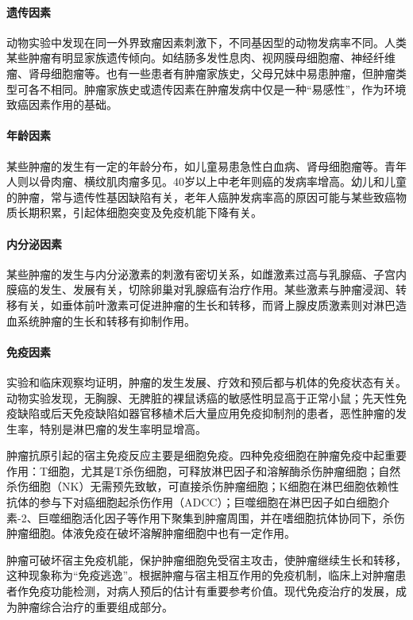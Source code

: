 \paragraph{遗传因素}
动物实验中发现在同一外界致瘤因素刺激下，不同基因型的动物发病率不同。人类某些肿瘤有明显家族遗传倾向。如结肠多发性息肉、视网膜母细胞瘤、神经纤维瘤、肾母细胞瘤等。也有一些患者有肿瘤家族史，父母兄妹中易患肿瘤，但肿瘤类型可各不相同。肿瘤家族史或遗传因素在肿瘤发病中仅是一种“易感性”，作为环境致癌因素作用的基础。

\paragraph{年龄因素}
某些肿瘤的发生有一定的年龄分布，如儿童易患急性白血病、肾母细胞瘤等。青年人则以骨肉瘤、横纹肌肉瘤多见。40岁以上中老年则癌的发病率增高。幼儿和儿童的肿瘤，常与遗传性基因缺陷有关，老年人癌肿发病率高的原因可能与某些致癌物质长期积累，引起体细胞突变及免疫机能下降有关。

\paragraph{内分泌因素}
某些肿瘤的发生与内分泌激素的刺激有密切关系，如雌激素过高与乳腺癌、子宫内膜癌的发生、发展有关，切除卵巢对乳腺癌有治疗作用。某些激素与肿瘤浸润、转移有关，如垂体前叶激素可促进肿瘤的生长和转移，而肾上腺皮质激素则对淋巴造血系统肿瘤的生长和转移有抑制作用。

\paragraph{免疫因素}
实验和临床观察均证明，肿瘤的发生发展、疗效和预后都与机体的免疫状态有关。动物实验发现，无胸腺、无脾脏的裸鼠诱癌的敏感性明显高于正常小鼠；先天性免疫缺陷或后天免疫缺陷如器官移植术后大量应用免疫抑制剂的患者，恶性肿瘤的发生率，特别是淋巴瘤的发生率明显增高。

肿瘤抗原引起的宿主免疫反应主要是细胞免疫。四种免疫细胞在肿瘤免疫中起重要作用：T细胞，尤其是T杀伤细胞，可释放淋巴因子和溶解酶杀伤肿瘤细胞；自然杀伤细胞（NK）无需预先致敏，可直接杀伤肿瘤细胞；K细胞在淋巴细胞依赖性抗体的参与下对癌细胞起杀伤作用（ADCC）；巨噬细胞在淋巴因子如白细胞介素-2、巨噬细胞活化因子等作用下聚集到肿瘤周围，并在嗜细胞抗体协同下，杀伤肿瘤细胞。体液免疫在破坏溶解肿瘤细胞中也有一定作用。

肿瘤可破坏宿主免疫机能，保护肿瘤细胞免受宿主攻击，使肿瘤继续生长和转移，这种现象称为“免疫逃逸”。根据肿瘤与宿主相互作用的免疫机制，临床上对肿瘤患者作免疫功能检测，对病人预后的估计有重要参考价值。现代免疫治疗的发展，成为肿瘤综合治疗的重要组成部分。

